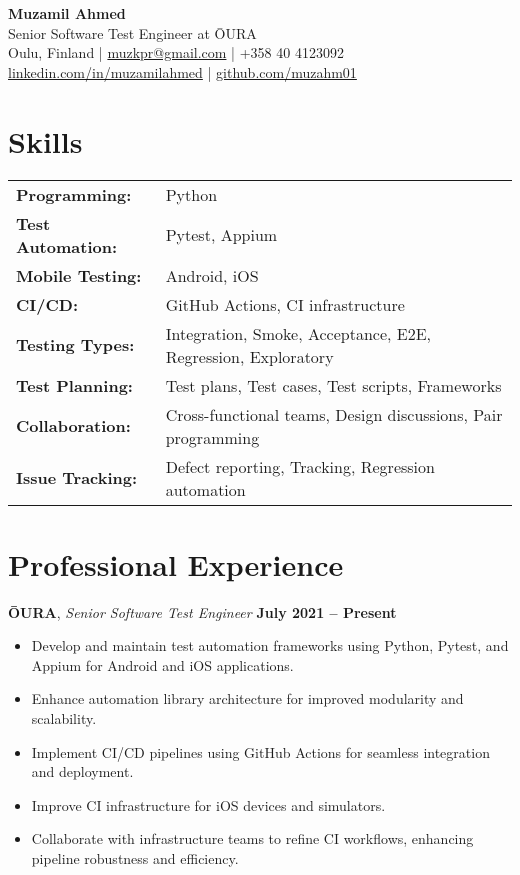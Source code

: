 \documentclass[12pt]{article}
\begin{document}
\begin{center}
    {\LARGE \textbf{Muzamil Ahmed}}\\
    Senior Software Test Engineer at ŌURA \\
    \vspace{0.1cm}
    Oulu, Finland \quad | \quad \href{mailto:muzkpr@gmail.com}{muzkpr@gmail.com} \quad | \quad +358 40 4123092 \\
    \href{https://linkedin.com/in/muzamilahmed}{linkedin.com/in/muzamilahmed} \quad | \quad \href{https://github.com/muzahm01}{github.com/muzahm01}
    \vspace{0.2cm}
\end{center}


\section*{Skills}

\begin{tabularx}{\textwidth}{@{} l X @{}}
\textbf{Programming:} & Python \\
\textbf{Test Automation:} & Pytest, Appium \\
\textbf{Mobile Testing:} & Android, iOS \\
\textbf{CI/CD:} & GitHub Actions, CI infrastructure \\
\textbf{Testing Types:} & Integration, Smoke, Acceptance, E2E, Regression, Exploratory \\
\textbf{Test Planning:} & Test plans, Test cases, Test scripts, Frameworks \\
\textbf{Collaboration:} & Cross-functional teams, Design discussions, Pair programming \\
\textbf{Issue Tracking:} & Defect reporting, Tracking, Regression automation \\
\end{tabularx}

\section*{Professional Experience}

\textbf{ŌURA}, \textit{Senior Software Test Engineer} \hfill \textbf{July 2021 – Present}
\begin{itemize}[leftmargin=1.5em]
    \item Develop and maintain test automation frameworks using Python, Pytest, and Appium for Android and iOS applications.
    \item Enhance automation library architecture for improved modularity and scalability.
    \item Implement CI/CD pipelines using GitHub Actions for seamless integration and deployment.
    \item Improve CI infrastructure for iOS devices and simulators.
    \item Collaborate with infrastructure teams to refine CI workflows, enhancing pipeline robustness and efficiency.
\end{itemize}
\end{document}
